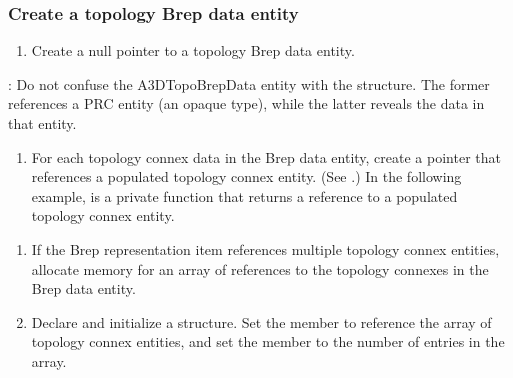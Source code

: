 \documentclass[letterpaper,12pt,english,openany,oneside]{sphinxmanual}
\begin{document}
\subsubsection{Create a topology Brep data entity}
\label{\detokenize{Plugins_A3D_API:create-a-topology-brep-data-entity}}\begin{enumerate}
%
\item {} 
Create a null pointer to a topology Brep data entity.

\end{enumerate}

\begin{sphinxVerbatim}[commandchars=\\\{\}]
   
\end{sphinxVerbatim}

 : Do not confuse the A3DTopoBrepData entity with the  structure. The former references a PRC entity (an opaque type), while the latter reveals the data in that entity.
\begin{enumerate}
%
\setcounter{enumi}{1}
\item {} 
For each topology connex data in the Brep data entity, create a pointer that references a populated topology connex entity. (See .) In the following example,  is a private function that returns a reference to a populated topology connex entity.

\end{enumerate}

\begin{sphinxVerbatim}[commandchars=\\\{\}]
   
\end{sphinxVerbatim}
\begin{enumerate}
%
\setcounter{enumi}{2}
\item {} 
If the Brep representation item references multiple topology connex entities, allocate memory for an array of references to the topology connexes in the Brep data entity.

\item {} 
Declare and initialize a  structure. Set the  member to reference the array of topology connex entities, and set the  member to the number of entries in the array.

\end{enumerate}
\end{document}
